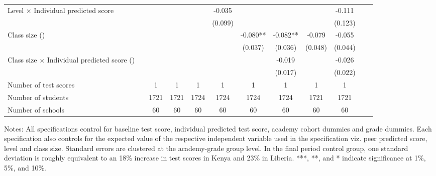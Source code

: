 \begin{center}
\begin{scriptsize}
\begin{threeparttable}
\begin{tabular} {@{} l l c c c c c c c c c c  @{}}
Level $\times$ Individual predicted score &  &  &  &  & -0.035 &  &  &  & -0.111 \\
                 &  &  &  &  & (0.099) &  &  &  & (0.123) \\
Class size (\times 10) &  &  &  &  &  & -0.080** & -0.082** & -0.079 & -0.055 \\
                 &  &  &  &  &  & (0.037) & (0.036) & (0.048) & (0.044) \\
Class size $\times$ Individual predicted score (\times 10) &  &  &  &  &  &  & -0.019 &  & -0.026 \\
                 &  &  &  &  &  &  & (0.017) &  & (0.022) \\
\midrule
Number of test scores &  & 1 & 1 & 1 & 1 & 1 & 1 & 1 & 1 \\
Number of students &  & 1721 & 1721 & 1724 & 1724 & 1724 & 1724 & 1721 & 1721 \\
Number of schools &  & 60 & 60 & 60 & 60 & 60 & 60 & 60 & 60 \\
\bottomrule
\end{tabular}
\begin{tablenotes}
\item Notes: All specifications control for baseline test score, individual predicted test score, academy cohort dummies and grade dummies. Each specification also controls for the expected value of the respective independent variable used in the specification viz. peer predicted score, level and class size. Standard errors are clustered at the academy-grade group level. In the final period control group, one standard deviation is roughly equivalent to an 18\% increase in test scores in Kenya and 23\% in Liberia. ***, **, and * indicate significance at 1\%, 5\%, and 10\%.\end{tablenotes}
\end{threeparttable}
\end{scriptsize}
\end{center}
\clearpage
